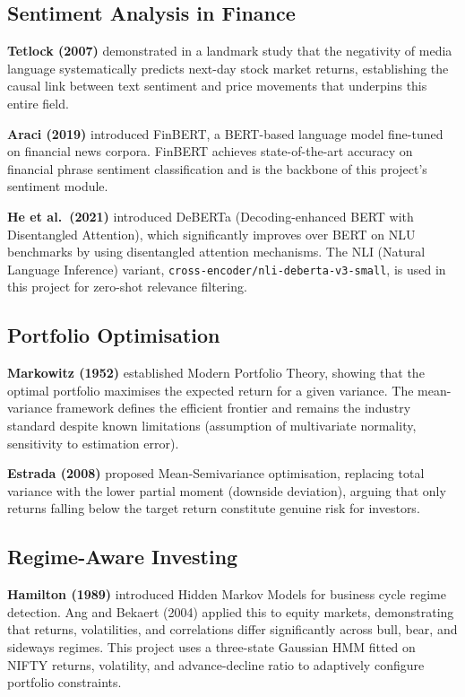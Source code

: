 \documentclass[12pt, a4paper]{article}
\begin{document}
\subsection{Sentiment Analysis in Finance}

\textbf{Tetlock (2007)} demonstrated in a landmark study that the negativity of media language systematically predicts next-day stock market returns, establishing the causal link between text sentiment and price movements that underpins this entire field.

\textbf{Araci (2019)} introduced FinBERT, a BERT-based language model fine-tuned on financial news corpora. FinBERT achieves state-of-the-art accuracy on financial phrase sentiment classification and is the backbone of this project's sentiment module.

\textbf{He et al.\ (2021)} introduced DeBERTa (Decoding-enhanced BERT with Disentangled Attention), which significantly improves over BERT on NLU benchmarks by using disentangled attention mechanisms. The NLI (Natural Language Inference) variant, \texttt{cross-encoder/nli-deberta-v3-small}, is used in this project for zero-shot relevance filtering.

\subsection{Portfolio Optimisation}

\textbf{Markowitz (1952)} established Modern Portfolio Theory, showing that the optimal portfolio maximises the expected return for a given variance. The mean-variance framework defines the efficient frontier and remains the industry standard despite known limitations (assumption of multivariate normality, sensitivity to estimation error).

\textbf{Estrada (2008)} proposed Mean-Semivariance optimisation, replacing total variance with the lower partial moment (downside deviation), arguing that only returns falling below the target return constitute genuine risk for investors.

\subsection{Regime-Aware Investing}

\textbf{Hamilton (1989)} introduced Hidden Markov Models for business cycle regime detection. Ang and Bekaert (2004) applied this to equity markets, demonstrating that returns, volatilities, and correlations differ significantly across bull, bear, and sideways regimes. This project uses a three-state Gaussian HMM fitted on NIFTY returns, volatility, and advance-decline ratio to adaptively configure portfolio constraints.
\end{document}
